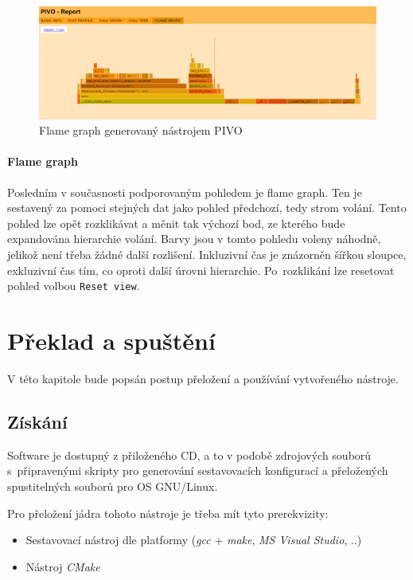 \documentclass[czech,BP]{thesiskiv}
\begin{document}
\begin{figure}[h]
    \centering
    \includegraphics[interpolate,width=1.0\textwidth]{img/pivo_flame.png}
    \caption{Flame graph generovaný nástrojem PIVO}
    \label{obr:implflame}
\end{figure}

\subsubsection*{Flame graph}

Posledním v současnosti podporovaným pohledem je flame graph. Ten je sestavený za pomoci stejných dat jako pohled předchozí, tedy strom volání. Tento pohled lze opět rozklikávat a měnit tak výchozí bod, ze kterého bude expandována hierarchie volání. Barvy jsou v tomto pohledu voleny náhodně, jelikož není třeba žádné další rozlišení. Inkluzivní čas je znázorněn šířkou sloupce, exkluzivní čas tím, co  oproti další úrovni hierarchie. Po~rozklikání lze resetovat pohled volbou \texttt{Reset view}.





\chapter{Překlad a spuštění}

V této kapitole bude popsán postup přeložení a používání vytvořeného nástroje.

\section{Získání}

Software je dostupný z přiloženého CD, a to v podobě zdrojových souborů s~připravenými skripty pro generování sestavovacích konfigurací a přeložených spustitelných souborů pro OS GNU/Linux.

Pro přeložení jádra tohoto nástroje je třeba mít tyto prerekvizity:

\begin{itemize}
\item Sestavovací nástroj dle platformy (\emph{gcc} + \emph{make}, \emph{MS Visual Studio}, ..)
\item Nástroj \emph{CMake}
\end{itemize}
\end{document}
